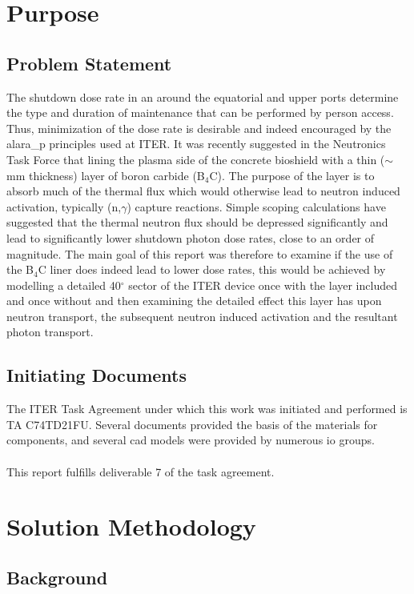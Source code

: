 \documentclass[12pt]{article}
\begin{document}
\section{Purpose}
\subsection{Problem Statement}
The shutdown dose rate in an around the equatorial and upper ports determine the
type and duration of maintenance that can be performed by person access. Thus,
minimization of the dose rate is desirable and indeed encouraged by the 
\gls{alara_p} principles used at ITER. It was recently suggested in the 
Neutronics Task Force that lining the plasma side of the concrete bioshield 
with a thin ($\sim$ mm thickness) layer of boron carbide (B$_4$C). The purpose 
of the layer is to absorb much of the thermal flux which would otherwise lead 
to neutron induced activation, typically (n,$\gamma$) capture reactions. Simple 
scoping calculations have suggested that the thermal neutron flux should be 
depressed significantly and lead to significantly lower shutdown photon dose 
rates, close to an order of magnitude. The main goal of this report was 
therefore to examine if the use of the B$_4$C liner does indeed lead to lower 
dose rates, this would be achieved by modelling a detailed 40$^{\circ}$ sector 
of the ITER device once with the layer included and once without and then 
examining the detailed effect this layer has upon neutron transport, the 
subsequent neutron induced activation and the resultant photon transport.
\subsection{Initiating Documents}
The ITER Task Agreement under which this work was initiated and performed is TA
C74TD21FU. Several documents provided the basis of the materials for components,
and several \gls{cad} models were provided by numerous \gls{io} groups.
\\
\\
This report fulfills deliverable 7 of the task agreement.
\newpage
\section{Solution Methodology}
\subsection{Background}
\end{document}
